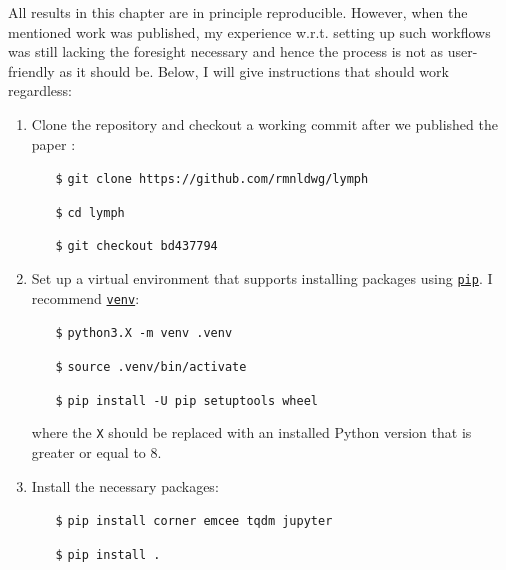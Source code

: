 \begin{tcolorbox}[title=\faIcon{recycle} Reproducibility, parbox=false]
    All results in this chapter are in principle reproducible. However, when the mentioned work \cite{ludwig_hidden_2021} was published, my experience w.r.t. setting up such workflows was still lacking the foresight necessary and hence the process is not as user-friendly as it should be. Below, I will give instructions that should work regardless:

    \begin{enumerate}
        \item Clone the  repository and checkout a working commit after we published the paper \cite{ludwig_hidden_2021}:
        \begin{itemize}[leftmargin=10mm]
            \setlength\itemsep{-0.5em}
            \item[\texttt{\$}] \verb|git clone https://github.com/rmnldwg/lymph|
            \item[\texttt{\$}] \verb|cd lymph|
            \item[\texttt{\$}] \verb|git checkout bd437794|
        \end{itemize}

        \item Set up a virtual environment that supports installing packages using \href{https://pypi.org/project/pip/}{\texttt{pip}}. I recommend \href{https://docs.python.org/3/library/venv.html}{\texttt{venv}}:
        \begin{itemize}[leftmargin=10mm]
            \setlength\itemsep{-0.5em}
            \item[\texttt{\$}] \verb|python3.X -m venv .venv|
            \item[\texttt{\$}] \verb|source .venv/bin/activate|
            \item[\texttt{\$}] \verb|pip install -U pip setuptools wheel|
        \end{itemize}
        where the \texttt{X} should be replaced with an installed Python version that is greater or equal to 8.

        \item Install the necessary packages:
        \begin{itemize}[leftmargin=10mm]
            \setlength\itemsep{-0.5em}
            \item[\texttt{\$}] \verb|pip install corner emcee tqdm jupyter|
            \item[\texttt{\$}] \verb|pip install .|
        \end{itemize}


\end{enumerate}
\end{tcolorbox}

